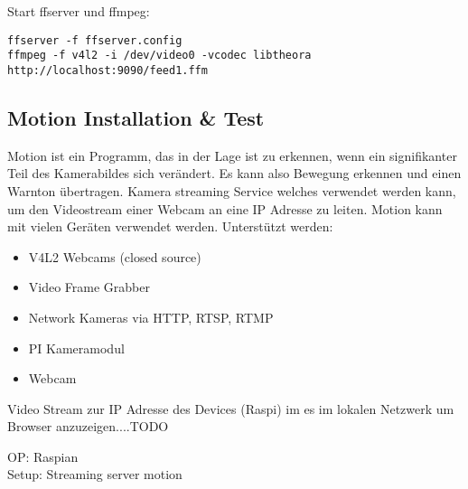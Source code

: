 Start ffserver und ffmpeg:
\begin{verbatim}
ffserver -f ffserver.config
ffmpeg -f v4l2 -i /dev/video0 -vcodec libtheora http://localhost:9090/feed1.ffm
\end{verbatim}
	
%
%


\subsection{Motion Installation \& Test}

Motion ist ein Programm, das in der Lage ist zu erkennen, wenn ein signifikanter Teil des Kamerabildes sich verändert. Es kann also 
Bewegung erkennen und einen Warnton übertragen. Kamera streaming 
Service welches verwendet werden kann, um den Videostream 
einer Webcam an eine IP Adresse zu leiten. Motion kann mit 
vielen Geräten verwendet werden. Unterstützt werden:
\begin{itemize}
\item V4L2 Webcams (closed source)
\item Video Frame Grabber
\item Network Kameras via HTTP, RTSP, RTMP
\item PI Kameramodul
\item Webcam
\end{itemize}

Video Stream zur IP Adresse des Devices (Raspi) im es im lokalen 
Netzwerk um Browser anzuzeigen....TODO

OP: Raspian\\
Setup: Streaming server motion\\


